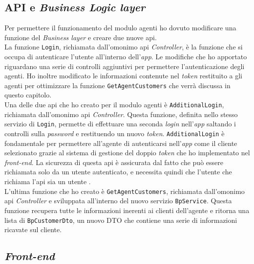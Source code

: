 \subsection{API e \textit{Business Logic layer}}
Per permettere il funzionamento del modulo agenti ho dovuto modificare una funzione del \textit{Business layer} 
e creare due nuove \gls{api}.\\
La funzione \texttt{Login}, richiamata dall'omonimo \gls{api} \textit{Controller}, è la funzione che si 
occupa di autenticare l'utente all'interno dell'\textit{app}. Le modifiche che ho apportato riguardano 
una serie di controlli aggiuntivi per permettere l'autenticazione degli agenti. Ho inoltre modificato le 
informazioni contenute nel \textit{token} restituito a gli agenti per ottimizzare la funzione 
\texttt{GetAgentCustomers} che verrà discussa in questo capitolo.\\
Una delle due \gls{api} che ho creato per il modulo agenti è \texttt{AdditionalLogin}, richiamata dall'omonimo 
\gls{api} \textit{Controller}. Questa funzione, definita nello stesso servizio di \texttt{Login}, permette 
di effettuare una seconda \textit{login} nell'\textit{app} saltando i controlli sulla \textit{password} e 
restituendo un nuovo \textit{token}. \texttt{AdditionalLogin} è fondamentale per permettere all'agente di 
autenticarsi nell'\textit{app} come il cliente selezionato grazie al sistema di gestione del doppio \textit{token} 
che ho implementato nel \textit{front-end}. La sicurezza di questa \gls{api} è assicurata dal fatto che 
può essere richiamata solo da un utente autenticato, e necessita quindi che l'utente che richiama l'\gls{api} 
sia un utente {\movi}.\\
L'ultima funzione che ho creato è \texttt{GetAgentCustomers}, richiamata dall'omonimo \gls{api} \textit{Controller} 
e sviluppata all'interno del nuovo servizio \texttt{BpService}. Questa funzione recupera tutte le informazioni 
inerenti ai clienti dell'agente e ritorna una lista di \texttt{BpCustomerDto}, un nuovo DTO che contiene una serie di 
informazioni ricavate sul cliente.

\subsection{\textit{Front-end}}

